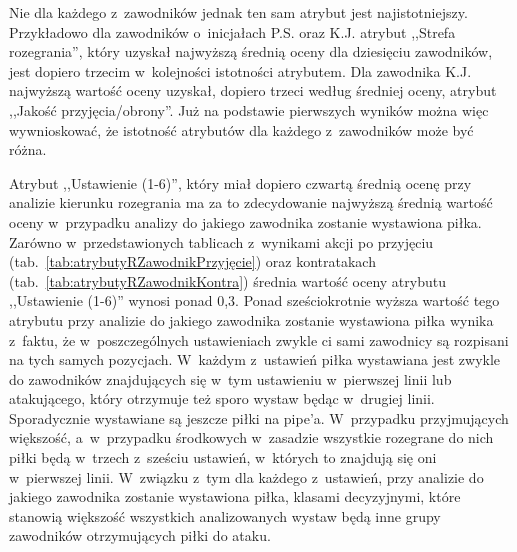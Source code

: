 \documentclass[a4paper,twoside,12pt]{book}
\begin{document}
Nie dla każdego z~zawodników jednak ten sam atrybut jest najistotniejszy. Przykładowo dla zawodników o~inicjałach P.S. oraz K.J. atrybut ,,Strefa rozegrania'', który uzyskał najwyższą średnią oceny dla dziesięciu zawodników, jest dopiero trzecim w~kolejności istotności atrybutem. Dla zawodnika K.J. najwyższą wartość oceny uzyskał, dopiero trzeci według średniej oceny, atrybut ,,Jakość przyjęcia/obrony''. Już na podstawie pierwszych wyników można więc wywnioskować, że istotność atrybutów dla każdego z~zawodników może być różna.  

Atrybut ,,Ustawienie (1-6)'', który miał dopiero czwartą średnią ocenę przy analizie kierunku rozegrania ma za to zdecydowanie najwyższą średnią wartość oceny w~przypadku analizy do jakiego zawodnika zostanie wystawiona piłka. Zarówno w~przedstawionych tablicach z~wynikami akcji po przyjęciu (tab.~\ref{tab:atrybutyRZawodnikPrzyjęcie}) oraz kontratakach (tab.~\ref{tab:atrybutyRZawodnikKontra}) średnia wartość oceny atrybutu ,,Ustawienie (1-6)'' wynosi ponad 0,3. Ponad sześciokrotnie wyższa wartość tego atrybutu przy analizie do jakiego zawodnika zostanie wystawiona piłka wynika z~faktu, że w~poszczególnych ustawieniach zwykle ci sami zawodnicy są rozpisani na tych samych pozycjach. W~każdym z~ustawień piłka wystawiana jest zwykle do zawodników znajdujących się w~tym ustawieniu w~pierwszej linii lub atakującego, który otrzymuje też sporo wystaw będąc w~drugiej linii. Sporadycznie wystawiane są jeszcze piłki na pipe'a. W~przypadku przyjmujących większość, a~w~przypadku środkowych w~zasadzie wszystkie rozegrane do nich piłki będą w~trzech z~sześciu ustawień, w~których to znajdują się oni w~pierwszej linii. W~związku z~tym dla każdego z~ustawień, przy analizie do jakiego zawodnika zostanie wystawiona piłka, klasami decyzyjnymi, które stanowią większość wszystkich analizowanych wystaw będą inne grupy zawodników otrzymujących piłki do ataku.
\end{document}
